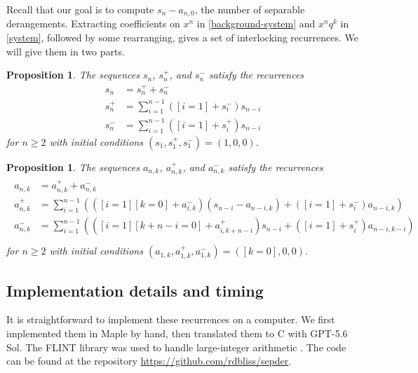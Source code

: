 \documentclass{article}
\theoremstyle{plain}
\newtheorem{prop}[theorem]{Proposition}
\theoremstyle{definition}
\theoremstyle{plain}
\begin{document}
Recall that our goal is to compute $s_n - a_{n, 0}$, the number of separable
derangements. Extracting coefficients on $x^n$ in \eqref{background-system} and
$x^n q^k$ in \eqref{system}, followed by some rearranging, gives a set of
interlocking recurrences. We will give them in two parts.

\begin{prop}
    The sequences $s_n$, $s^+_n$, and $s^-_n$ satisfy the recurrences
    \begin{align*}
        s_n &= s^+_n + s^-_n \\
        s^+_n &= \sum_{i = 1}^{n - 1} ([i = 1] + s^-_i) s_{n - i} \\
        s^-_n &= \sum_{i = 1}^{n - 1} ([i = 1] + s^+_i) s_{n - i}
    \end{align*}
    for $n \geq 2$ with initial conditions $(s_1, s^+_1, s^-_1) = (1, 0, 0)$.
\end{prop}

\begin{prop}
    The sequences $a_{n, k}$, $a^+_{n, k}$, and $a^-_{n, k}$ satisfy the
    recurrences
    \begin{align}
    \label{recurrences}
    \begin{split}
        a_{n, k} &= a^+_{n, k} + a^-_{n, k} \\
        a^+_{n,k} &= \sum_{i = 1}^{n - 1}
            \left(
                ([i = 1][k = 0] + a^-_{i, k}) (s_{n - i} - a_{n - i, k})
                +
                ([i = 1] + s^-_i) a_{n - i, k}
            \right) \\
        a^-_{n,k} &= \sum_{i = 1}^{n - 1}
            \left(
                ([i = 1][k + n - i = 0] + a^+_{i, k + n - i}) s_{n - i}
                +
                ([i = 1] + s^+_i) a_{n - i, k - i}
            \right) \\
    \end{split}
    \end{align}
    for $n \geq 2$ with initial conditions $(a_{1, k}, a^+_{1, k}, a^-_{1, k}) = ([k = 0], 0, 0)$.
\end{prop}

\subsection{Implementation details and timing}

It is straightforward to implement these recurrences on a computer. We first
implemented them in Maple by hand, then translated them to C with GPT-5.6 Sol.
The FLINT library was used to handle large-integer arithmetic \cite{flint}. The
code can be found at the repository \url{https://github.com/rdbliss/sepder}.
\end{document}
